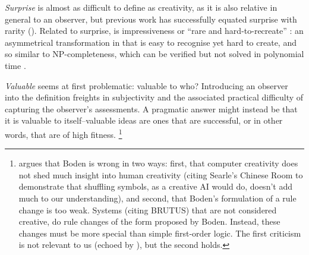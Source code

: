 \emph{Surprise} is almost as difficult to define as creativity, as it is also relative in general to an observer, but previous work has successfully equated surprise with rarity (\eg \textcite{Kowaliw2009}). Related to surprise, is impressiveness or ``rare and hard-to-recreate'' \parencite{Lehman2012}: an asymmetrical transformation in that is easy to recognise yet hard to create, and so similar to NP-completeness, which can be verified but not solved in polynomial time \parencite{Lehman2012}.

\emph{Valuable} seems at first problematic: valuable to who? Introducing an observer into the definition freights in subjectivity and the associated practical difficulty of capturing the observer's assessments. A pragmatic answer might instead be that it is valuable to itself--valuable ideas are ones that are successful, or in other words, that are of high fitness. 
\footnote{\Textcite{Bringsjord2000} argues that Boden is wrong in two ways: first, that computer creativity does not shed much insight into human creativity (citing Searle's Chinese Room to demonstrate that shuffling symbols, as a creative AI would do, doesn't add much to our understanding), and second, that Boden's formulation of a rule change is too weak. Systems (citing BRUTUS) that are not considered creative, do rule changes of the form proposed by Boden. Instead, these changes must be more special than simple first-order logic. The first criticism is not relevant to us (echoed by \textcite{Dorin2009}), but the second holds.}

